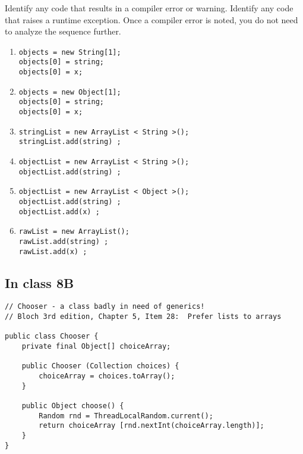 \documentclass[11pt]{article}
\begin{document}
Identify any code that results in a compiler error or warning.
Identify any code that raises a runtime exception.
Once a compiler error is noted, you do not need to analyze the sequence further.

\begin{enumerate}
\item \begin{verbatim}
objects = new String[1]; 
objects[0] = string;     
objects[0] = x;        
\end{verbatim}

\item \begin{verbatim}
objects = new Object[1];
objects[0] = string;   
objects[0] = x;     
\end{verbatim}

\item \begin{verbatim}
stringList = new ArrayList < String >();
stringList.add(string) ;
\end{verbatim}

\item \begin{verbatim}
objectList = new ArrayList < String >();
objectList.add(string) ;
\end{verbatim}

\item \begin{verbatim}
objectList = new ArrayList < Object >(); 
objectList.add(string) ;      
objectList.add(x) ;        
\end{verbatim}

\item \begin{verbatim}
rawList = new ArrayList();
rawList.add(string) ;    
rawList.add(x) ;       
\end{verbatim}
\end{enumerate}

\subsection{In class 8B}
\label{sec:org50147d0}
\begin{verbatim}
// Chooser - a class badly in need of generics!
// Bloch 3rd edition, Chapter 5, Item 28:  Prefer lists to arrays

public class Chooser {
    private final Object[] choiceArray;

    public Chooser (Collection choices) {
        choiceArray = choices.toArray();
    }

    public Object choose() { 
        Random rnd = ThreadLocalRandom.current();
        return choiceArray [rnd.nextInt(choiceArray.length)];
    }
}
\end{verbatim}
\end{document}
